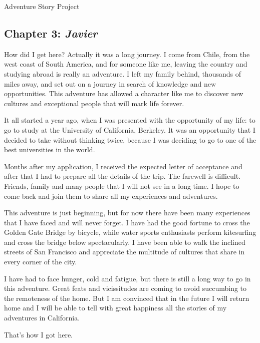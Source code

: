 \documentclass{article}
\begin{document}
\Huge Adventure Story Project

\normalsize

\subsection*{Chapter 3: \textit{Javier}}

How did I get here? Actually it was a long journey. I come from Chile, from the west coast of South America, and for someone like me, leaving the country and studying abroad is really an adventure. I left my family behind, thousands of miles away, and set out on a journey in search of knowledge and new opportunities. This adventure has allowed a character like me to discover new cultures and exceptional people that will mark life forever.

It all started a year ago, when I was presented with the opportunity of my life: to go to study at the University of California, Berkeley. It was an opportunity that I decided to take without thinking twice, because I was deciding to go to one of the best universities in the world.

Months after my application, I received the expected letter of acceptance and after that I had to prepare all the details of the trip. The farewell is difficult. Friends, family and many people that I will not see in a long time. I hope to come back and join them to share all my experiences and adventures.

This adventure is just beginning, but for now there have been many experiences that I have faced and will never forget. I have had the good fortune to cross the Golden Gate Bridge by bicycle, while water sports enthusiasts perform kitesurfing and cross the bridge below spectacularly. I have been able to walk the inclined streets of San Francisco and appreciate the multitude of cultures that share in every corner of the city.

I have had to face hunger, cold and fatigue, but there is still a long way to go in this adventure. Great feats and vicissitudes are coming to avoid succumbing to the remoteness of the home. But I am convinced that in the future I will return home and I will be able to tell with great happiness all the stories of my adventures in California.

That's how I got here.
\end{document}
